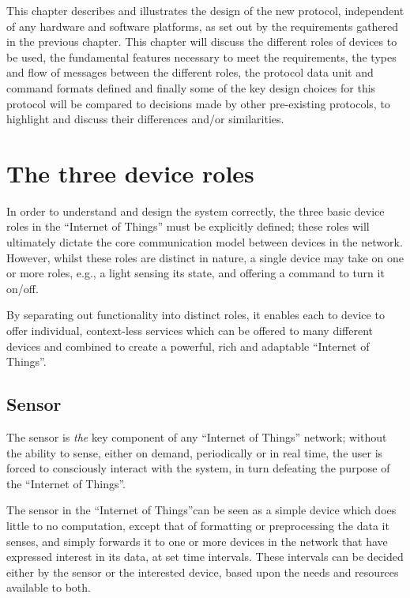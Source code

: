 \newlength{\maxheight}

\newcommand{\baselinealign}[1]{%
	\centering
	\raisebox{0pt}[\maxheight][0pt]{#1}%
}


This chapter describes and illustrates the design of the new protocol, independent of any hardware and software platforms, as set out by the requirements gathered in the previous chapter. This chapter will discuss the different roles of devices to be used, the fundamental features necessary to meet the requirements, the types and flow of messages between the different roles, the protocol data unit and command formats defined and finally some of the key design choices for this protocol will be compared to decisions made by other pre-existing protocols, to highlight and discuss their differences and/or similarities.

\section{The three device roles} %
\label{sec:the_3_classifications_of_devices}
In order to understand and design the system correctly, the three basic device roles in the ``Internet of Things'' must be explicitly defined; these roles will ultimately dictate the core communication model between devices in the network. However, whilst these roles are distinct in nature, a single device may take on one or more roles, e.g., a light sensing its state, and offering a command to turn it on/off.

By separating out functionality into distinct roles, it enables each to device to offer individual, context-less services which can be offered to many different devices and combined to create a powerful, rich and adaptable ``Internet of Things''.

\subsection{Sensor} %
\label{sub:sensor}
The sensor is \textit{the} key component of any ``Internet of Things'' network; without the ability to sense, either on demand, periodically or in real time, the user is forced to consciously interact with the system, in turn defeating the purpose of the ``Internet of Things''.

The sensor in the ``Internet of Things''can be seen as a simple device which does little to no computation, except that of formatting or preprocessing the data it senses, and simply forwards it to one or more devices in the network that have expressed interest in its data, at set time intervals. These intervals can be decided either by the sensor or the interested device, based upon the needs and resources available to both.

